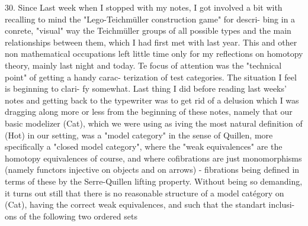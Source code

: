 30. Since Last week when I stopped with my notes, I got involved a bit
with recalling to mind the "Lego-Teichmüller construction game" for descri-%
bing in a conrete, "visual" way the Teichmüller groups of all possible
types and the main relationships between them, which I had first met with
last year. This and other non mathematical occupations left little time
only for my reflections on homotopy theory,  mainly last night and today.
Te focus of attention was the "technical point" of getting a handy carac-%
terization of test categories. The situation I feel is beginning to clari-%
fy somewhat. Last thing I did\hand{,} before reading last weeks' notes and getting
back to the typewriter\hand{,} was to get rid of a delusion which I was dragging
along more or less from the beginning of these notes, namely that our
basic modelizer (Cat), which we were using  as iving the most
natural definition of (Hot) in our setting, was a "model category" in the
sense of Quillen, more specifically a "closed model category", where
the "weak equivalences" are the homotopy equivalences of course, and where
cofibrations are just monomorphisms (namely functors injective on objects
and on arrows) - fibrations being defined in terms of these by the
 Serre-Quillen lifting property. Without  being so demanding, it turns out
still that there is no reasonable structure of a model catégory on (Cat),
having the correct weak equivalences, and such that the standart  inclusi-%
ons of the following two ordered sets
